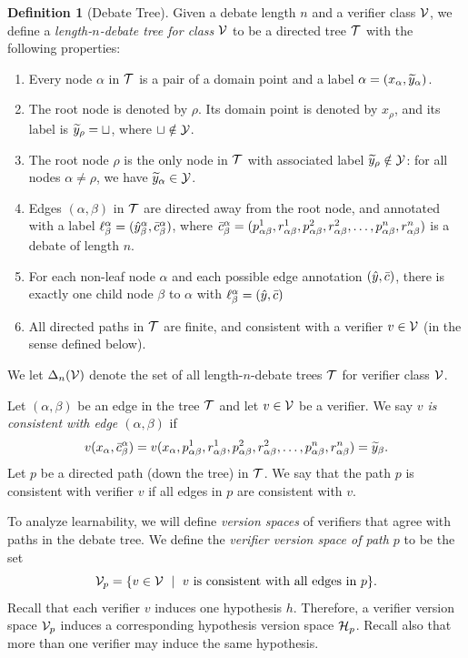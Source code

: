 \documentclass[11pt,letterpaper]{article}
\theoremstyle{definition}
\newtheorem{definition}[theorem]{Definition}
\theoremstyle{plain}
\begin{document}
\begin{definition}[Debate Tree]
Given a debate length $n$ and a verifier class ${\mathcal V}$, we define a \emph{length-$n$-debate tree for class ${\mathcal V}$} to be a directed tree ${\mathcal T}$ with the following properties:
\begin{enumerate}
    \item Every node $\alpha$ in ${\mathcal T}$ is a pair of a domain point and a label $\alpha=(x_\alpha, {\widetilde{y}}_\alpha)$.
    \item The root node is denoted by $\rho$. Its domain point is denoted by $x_\rho$, and its label is ${\widetilde{y}}_\rho = \sqcup$, where $\sqcup\notin{\mathcal Y}$. \item The root node $\rho$ is the only node in ${\mathcal T}$ with associated label ${\widetilde{y}}_\rho \notin{\mathcal Y}$: for all nodes $\alpha\neq \rho$, we have ${\widetilde{y}}_\alpha\in {\mathcal Y}$.
    \item Edges $(\alpha, \beta)$ in ${\mathcal T}$ are directed away from the root node, and annotated with a label $\ell^\alpha_\beta = ({\hat{y}}^\alpha_\beta, \bar{c}^\alpha_\beta)$, where $\bar{c}^\alpha_\beta = ({p}^1_{\alpha\beta}, {r}^1_{\alpha\beta}, {p}^2_{\alpha\beta}, {r}^2_{\alpha\beta}, \ldots,  {p}^n_{\alpha\beta}, {r}^n_{\alpha\beta})$ is a debate of length $n$.
    \item For each non-leaf node $\alpha$ and each possible edge annotation $({\hat{y}}, \bar{c})$, there is exactly one child node $\beta$ to $\alpha$ with $\ell^\alpha_\beta = ({\hat{y}}, \bar{c})$
    \item All directed paths in ${\mathcal T}$ are finite, and consistent with a verifier $v\in{\mathcal V}$ (in the sense defined below).
\end{enumerate}
We let $\Delta_n({\mathcal V})$ denote the set of all length-$n$-debate trees ${\mathcal T}$ for verifier class ${\mathcal V}$.
\end{definition}


Let $(\alpha,\beta)$ be an edge in the tree ${\mathcal T}$ and let $v\in{\mathcal V}$ be a verifier. We say \emph{$v$ is consistent with edge $(\alpha, \beta)$} if
\[
v(x_\alpha, \bar{c}^\alpha_\beta) = v(x_\alpha, {p}^1_{\alpha\beta}, {r}^1_{\alpha\beta}, {p}^2_{\alpha\beta}, {r}^2_{\alpha\beta}, \ldots,  {p}^n_{\alpha\beta}, {r}^n_{\alpha\beta}) = {\widetilde{y}}_\beta.
\]
Let $p$ be a directed path (down the tree) in ${\mathcal T}$. We say that the path $p$ is consistent with verifier $v$ if all edges in $p$ are consistent with $v$.

To analyze learnability, we will define \emph{version spaces} of verifiers that agree with paths in the debate tree.
 We define the \emph{verifier version space of path $p$} to be the set
\[
 {\mathcal V}_p = \{ v\in{\mathcal V} ~\mid~ v \text{ is consistent with all edges in }p\}.
\]
Recall that each verifier $v$ induces one hypothesis $h$. Therefore, a verifier version space ${\mathcal V}_p$ induces a corresponding hypothesis version space ${{\mathcal H}}_p$. Recall also that more than one verifier may induce the same hypothesis.
\end{document}
